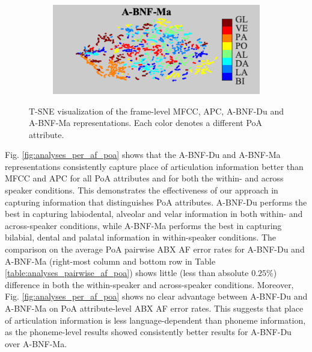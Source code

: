 \documentclass[transmag]{IEEEtran}
\begin{document}
\begin{figure}[!t]
\begin{subfigure}{0.49\linewidth}
	   \centering
	   \includegraphics[width=1\linewidth]{Rtsne_af_poa_bnf_aidatatang_apc_input_disc_bar_adjust_journal.png}
    \end{subfigure}
    \caption{T-SNE visualization of the frame-level  MFCC, APC, A-BNF-Du and A-BNF-Ma representations. Each color denotes a different PoA attribute.}
    \label{fig:analysis_tsne_poa}

\end{figure}

Fig. \ref{fig:analyses_per_af_poa} shows that the A-BNF-Du and A-BNF-Ma representations consistently capture place of articulation information better than MFCC and APC for all PoA attributes and for both the within- and across speaker conditions. This demonstrates the effectiveness of our approach in capturing information that distinguishes PoA attributes. A-BNF-Du performs the best in capturing labiodental, alveolar and velar information in both within- and across-speaker conditions, while A-BNF-Ma performs the best in capturing bilabial, dental and palatal information in within-speaker conditions.
The comparison on the average PoA pairwise ABX AF error rates for A-BNF-Du and A-BNF-Ma (right-most column and bottom row in Table \ref{table:analyses_pairwise_af_poa}) shows little (less than absolute $0.25\%$) difference in both the within-speaker and across-speaker conditions. Moreover, Fig. \ref{fig:analyses_per_af_poa} shows no clear advantage between A-BNF-Du and A-BNF-Ma on PoA attribute-level ABX AF error rates.  This suggests that place of articulation information is less language-dependent than phoneme information, as the phoneme-level results showed consistently better results for A-BNF-Du over A-BNF-Ma.

\end{document}
